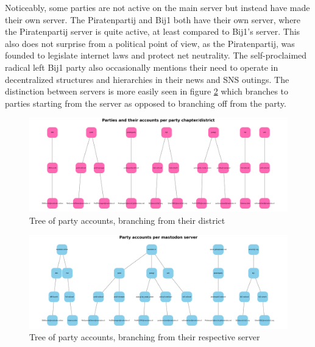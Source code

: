 Noticeably, some parties are not active on the main server but instead have made their own server.
The Piratenpartij and Bij1 both have their own server, where the Piratenpartij server is quite active, at least compared to Bij1's server.
This also does not surprise from a political point of view, as the Piratenpartij, was founded to legislate internet laws and protect net neutrality.
The self-proclaimed radical left Bij1 party also occasionally mentions their need to operate in decentralized structures and hierarchies in their news and SNS outings.
The distinction between servers is more easily seen in figure \ref{fig:servernetwork} which branches to parties starting from the server as opposed to branching off from the party.

\begin{figure}[ht]
  \centering
  \includegraphics[width=\linewidth]{media/chapter.png}
  \caption{Tree of party accounts, branching from their district}
  \label{fig:partynetwork}
\end{figure}

\begin{figure}[ht]
  \centering
  \includegraphics[width=\linewidth]{media/server.png}
  \caption{Tree of party accounts, branching from their respective server}
  \label{fig:servernetwork}
\end{figure}


